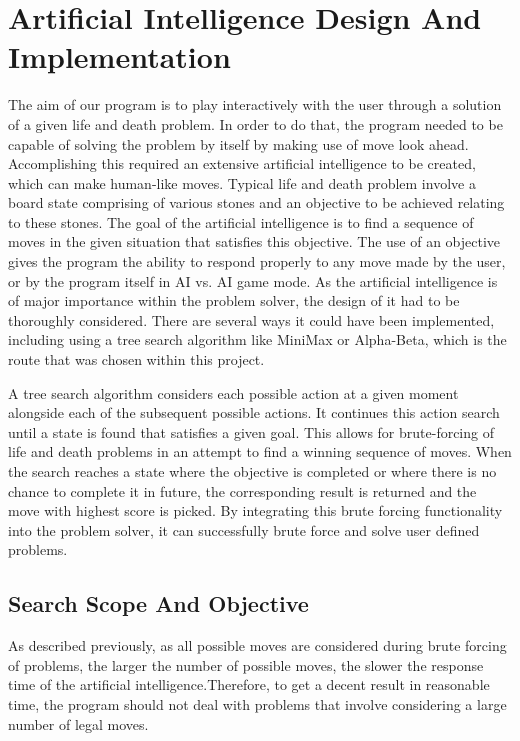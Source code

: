 \documentclass{l3proj}
\begin{document}
\section{Artificial Intelligence Design And Implementation}

The aim of our program is to play interactively with the user through a solution of a given life and death problem. In order to do that, the program needed to be capable of solving the problem by itself by making use of move look ahead. Accomplishing this required an extensive artificial intelligence to be created, which can make human-like moves. Typical life and death problem involve a board state comprising of various stones and an objective to be achieved relating to these stones. The goal of the artificial intelligence is to find a sequence of moves in the given situation that satisfies this objective. The use of an objective gives the program the ability to respond properly to any move made by the user, or by the program itself in AI vs. AI game mode. As the artificial intelligence is of major importance within the problem solver, the design of it had to be thoroughly considered. There are several ways it could have been implemented, including using a tree search algorithm like MiniMax or Alpha-Beta, which is the route that was chosen within this project.
 
A tree search algorithm considers each possible action at a given moment alongside each of the subsequent possible actions. It continues this action search until a state is found that satisfies a given goal. This allows for brute-forcing of life and death problems in an attempt to find a winning sequence of moves. When the search reaches a state where the objective is completed or where there is no chance to complete it in future, the corresponding result is returned and the move with highest score is picked. By integrating this brute forcing functionality into the problem solver, it can successfully brute force and solve user defined problems.

\subsection{Search Scope And Objective}

As described previously, as all possible moves are considered during brute forcing of problems, the larger the number of possible moves, the slower the response time of the artificial intelligence.Therefore, to get a decent result in reasonable time, the program should not deal with problems that involve considering a large number of legal moves.
\end{document}
